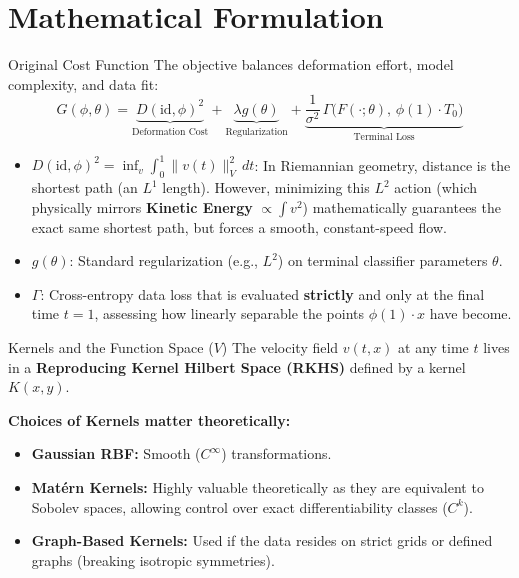 \documentclass[aspectratio=169]{beamer}
\begin{document}
\section{Mathematical Formulation}

\begin{frame}{Original Cost Function}
The objective balances deformation effort, model complexity, and data fit:
\[
G(\phi,\theta)= \underbrace{D(\mathrm{id},\phi)^2}_{\text{Deformation Cost}} + \underbrace{\lambda g(\theta)}_{\text{Regularization}} + \underbrace{\frac{1}{\sigma^2}\,\Gamma\big(F(\cdot;\theta),\,\phi(1)\cdot T_0\big)}_{\text{Terminal Loss}}
\]

\begin{itemize}
  \item $D(\mathrm{id},\phi)^2 = \inf_v \int_0^1 \|v(t)\|_V^2\,dt$: In Riemannian geometry, distance is the shortest path (an $L^1$ length). However, minimizing this $L^2$ action (which physically mirrors \textbf{Kinetic Energy} $\propto \int v^2$) mathematically guarantees the exact same shortest path, but forces a smooth, constant-speed flow.
  \item $g(\theta)$: Standard regularization (e.g., $L^2$) on terminal classifier parameters $\theta$.
  \item $\Gamma$: Cross-entropy data loss that is evaluated \textbf{strictly} and only at the final time $t=1$, assessing how linearly separable the points $\phi(1)\cdot x$ have become.
\end{itemize}
\end{frame}






\begin{frame}{Kernels and the Function Space ($V$)}
The velocity field $v(t, x)$ at any time $t$ lives in a \textbf{Reproducing Kernel Hilbert Space (RKHS)} defined by a kernel $K(x,y)$.

\textbf{Choices of Kernels matter theoretically:}
\begin{itemize}
  \item \textbf{Gaussian RBF:} Smooth ($C^\infty$) transformations.
  \item \textbf{Matérn Kernels:} Highly valuable theoretically as they are equivalent to Sobolev spaces, allowing control over exact differentiability classes ($C^k$).
  \item \textbf{Graph-Based Kernels:} Used if the data resides on strict grids or defined graphs (breaking isotropic symmetries).
\end{itemize}
\end{frame}
\end{document}

